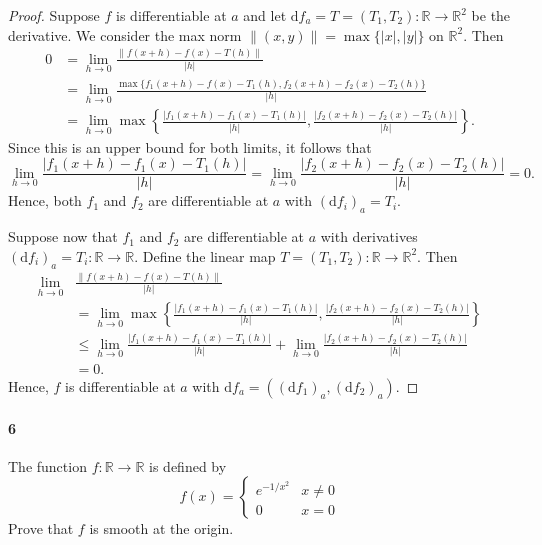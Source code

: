\documentclass[12pt]{article}
\newlength{\myparskip}
\newenvironment{fullbox}{\begin{lrbox}{\savefullbox}\begin{minipage}{\dimexpr\textwidth-2\fboxsep\relax}\setlength{\parskip}{\myparskip}}{\end{minipage}\end{lrbox}\framebox[\textwidth]{\usebox{\savefullbox}}}
\newenvironment{pbox}[1][]{\begin{fullbox}\ifx#1\empty\else\paragraph{#1}\phantom{}\fi}{\end{fullbox}}
\theoremstyle{definition}
\newcommand{\R}{\mathbb{R}}
\newcommand{\<}{\langle}
\renewcommand{\>}{\rangle}
\newcommand{\dd}{\mathrm{d}}
\begin{document}
\begin{proof}
    Suppose $f$ is differentiable at $a$ and let $\dd{f}_a = T = (T_1, T_2) : \R \to \R^2$ be the derivative.
    We consider the max norm $\|(x, y)\| = \max\{|x|, |y|\}$ on $\R^2$.
    Then
    \begin{align*}
        0
            &= \lim_{h \to 0} \frac{\|f(x + h) - f(x) - T(h)\|}{|h|} \\
            &= \lim_{h \to 0} \frac{\max\{f_1(x + h) - f(x) - T_1(h), f_2(x + h) - f_2(x) - T_2(h)\}}{|h|} \\
            &= \lim_{h \to 0} \max\left\{\frac{|f_1(x + h) - f_1(x) - T_1(h)|}{|h|}, \frac{|f_2(x + h) - f_2(x) - T_2(h)|}{|h|}\right\}.
    \end{align*}
    Since this is an upper bound for both limits, it follows that
    \[
        \lim_{h \to 0} \frac{|f_1(x + h) - f_1(x) - T_1(h)|}{|h|}
            = \lim_{h \to 0} \frac{|f_2(x + h) - f_2(x) - T_2(h)|}{|h|}
            = 0. 
    \]
    Hence, both $f_1$ and $f_2$ are differentiable at $a$ with $(\dd{f_i})_a = T_i$.

    Suppose now that $f_1$ and $f_2$ are differentiable at $a$ with derivatives $(\dd{f_i})_a = T_i : \R \to \R$.
    Define the linear map $T = (T_1, T_2) : \R \to \R^2$.
    Then
    \begin{align*}
        \lim_{h \to 0} &\frac{\|f(x + h) - f(x) - T(h)\|}{|h|} \\
            &= \lim_{h \to 0} \max\left\{\frac{|f_1(x + h) - f_1(x) - T_1(h)|}{|h|}, \frac{|f_2(x + h) - f_2(x) - T_2(h)|}{|h|}\right\} \\
            &\leq \lim_{h \to 0} \frac{|f_1(x + h) - f_1(x) - T_1(h)|}{|h|} + \lim_{h \to 0} \frac{|f_2(x + h) - f_2(x) - T_2(h)|}{|h|} \\
            &= 0.
    \end{align*}
    Hence, $f$ is differentiable at $a$ with $\dd{f}_a = ((\dd{f_1})_a, (\dd{f_2})_a)$.
\end{proof}

\begin{pbox}[6]
    The function $f:\R \to \R$ is defined by
    \[
        f(x) = \begin{cases}
            e^{-1/x^2} & x \neq 0\\
            0 & x = 0
        \end{cases}
    \]
    Prove that $f$ is smooth at the origin.
\end{pbox}
\end{document}

